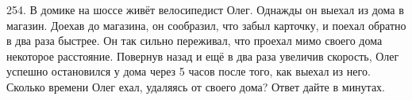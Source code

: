 254. В домике на шоссе живёт велосипедист Олег. Однажды он выехал из дома в магазин. Доехав до магазина, он сообразил, что забыл карточку, и поехал обратно в два раза быстрее. Он так сильно переживал, что проехал мимо своего дома некоторое расстояние. Повернув назад и ещё в два раза увеличив скорость, Олег успешно остановился у дома через 5 часов после того, как выехал из него. Сколько времени Олег ехал, удаляясь от своего дома? Ответ дайте в минутах.\\
